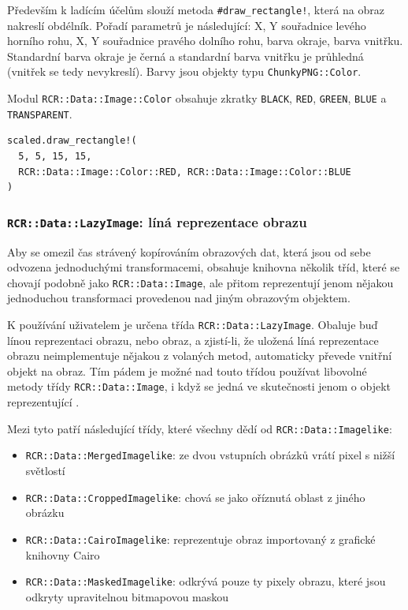 \documentclass[a4paper]{article}
\begin{document}
Především k ladícím účelům slouží metoda \texttt{\#draw\_rectangle!}, která na
obraz nakreslí obdélník. Pořadí parametrů je následující: X, Y souřadnice levého
horního rohu, X, Y souřadnice pravého dolního rohu, barva okraje, barva vnitřku.
Standardní barva okraje je černá a standardní barva vnitřku je průhledná
(vnitřek se tedy nevykreslí). Barvy jsou objekty typu \texttt{ChunkyPNG::Color}.

Modul \texttt{RCR::Data::Image::Color} obsahuje zkratky \texttt{BLACK},
\texttt{RED}, \texttt{GREEN}, \texttt{BLUE} a \texttt{TRANSPARENT}.
\begin{lstlisting}
scaled.draw_rectangle!(
  5, 5, 15, 15,
  RCR::Data::Image::Color::RED, RCR::Data::Image::Color::BLUE
)
\end{lstlisting}

\subsubsection{\texttt{RCR::Data::LazyImage}: líná reprezentace obrazu}
Aby se omezil čas strávený kopírováním obrazových dat, která jsou od sebe
odvozena jednoduchými transformacemi, obsahuje knihovna několik tříd, které
se chovají podobně jako \texttt{RCR::Data::Image}, ale přitom reprezentují
jenom nějakou jednoduchou transformaci provedenou nad jiným obrazovým objektem.

K používání uživatelem je určena třída \texttt{RCR::Data::LazyImage}.
Obaluje buď línou reprezentaci obrazu, nebo obraz, a zjistí-li, že uložená
líná reprezentace obrazu neimplementuje nějakou z volaných metod, automaticky
převede vnitřní objekt na obraz. Tím pádem je možné nad touto třídou používat
libovolné metody třídy \texttt{RCR::Data::Image}, i když se jedná ve skutečnosti
jenom o objekt reprezentující .

Mezi tyto  patří následující třídy, které všechny
dědí od \texttt{RCR::Data::Imagelike}:
\begin{itemize}
\item \texttt{RCR::Data::MergedImagelike}: ze dvou vstupních obrázků vrátí pixel
	s nižší světlostí
\item \texttt{RCR::Data::CroppedImagelike}: chová se jako
	oříznutá oblast z jiného obrázku
\item \texttt{RCR::Data::CairoImagelike}: reprezentuje obraz importovaný z grafické knihovny Cairo
\item \texttt{RCR::Data::MaskedImagelike}: odkrývá pouze ty pixely obrazu, které
	jsou odkryty upravitelnou bitmapovou maskou
\end{itemize}
\end{document}
